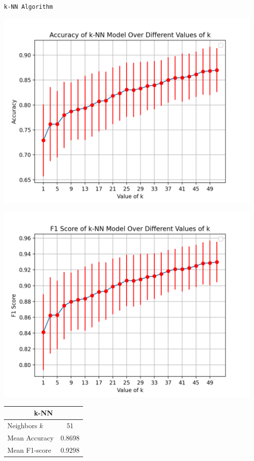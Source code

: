\documentclass{article}
\begin{document}
\newpage
\begin{center}
    \texttt{k-NN Algorithm}
\end{center}
\begin{minipage}{0.49\textwidth}
    \centering

    \includegraphics*[width=\textwidth]{./src/figures/Accuracy Digits.png}

    \includegraphics*[width=\textwidth]{./src/figures/F-Score Digits.png}
    
    \begin{tabular}{lc}
        \toprule
        \multicolumn{2}{c}{k-NN} \\
        \midrule
        Neighbors $k$ & 51 \\
        Mean Accuracy & 0.8698 \\
        Mean F1-score & 0.9298 \\
        \bottomrule
    \end{tabular}
\end{minipage}
\end{document}
